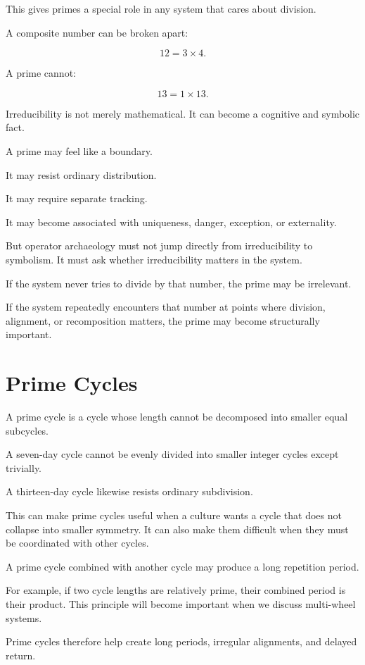\documentclass[11pt]{book}
\begin{document}
This gives primes a special role in any system that cares about division.

A composite number can be broken apart:

\[
12 = 3 \times 4.
\]

A prime cannot:

\[
13 = 1 \times 13.
\]

Irreducibility is not merely mathematical. It can become a cognitive and symbolic fact.

A prime may feel like a boundary.

It may resist ordinary distribution.

It may require separate tracking.

It may become associated with uniqueness, danger, exception, or externality.

But operator archaeology must not jump directly from irreducibility to symbolism. It must ask whether irreducibility matters in the system.

If the system never tries to divide by that number, the prime may be irrelevant.

If the system repeatedly encounters that number at points where division, alignment, or recomposition matters, the prime may become structurally important.

\section{Prime Cycles}

A prime cycle is a cycle whose length cannot be decomposed into smaller equal subcycles.

A seven-day cycle cannot be evenly divided into smaller integer cycles except trivially.

A thirteen-day cycle likewise resists ordinary subdivision.

This can make prime cycles useful when a culture wants a cycle that does not collapse into smaller symmetry. It can also make them difficult when they must be coordinated with other cycles.

A prime cycle combined with another cycle may produce a long repetition period.

For example, if two cycle lengths are relatively prime, their combined period is their product. This principle will become important when we discuss multi-wheel systems.

Prime cycles therefore help create long periods, irregular alignments, and delayed return.
\end{document}
